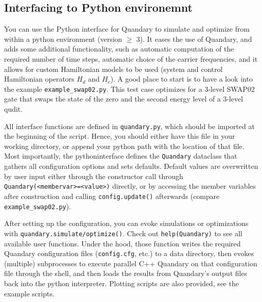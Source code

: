 \documentclass[11pt]{article}
\begin{document}
\subsection{Interfacing to Python environemnt}
You can use the Python interface for Quandary to simulate and optimize from within a python environment (version $\geq$ 3). It eases the use of Quandary, and adds some additional functionality, such as automatic computation of the required number of time steps, automatic choice of the carrier frequencies, and it allows for custom Hamiltonian models to be used (system and control Hamiltonian operators $H_d$ and $H_c$). A good place to start is to have a look into the example \texttt{example\_swap02.py}. This test case optimizes for a 3-level SWAP02 gate that swaps the state of the zero and the second energy level of a 3-level qudit. 

All interface functions are defined in \texttt{quandary.py}, which should be imported at the beginning of the script. Hence, you should either have this file in your working directory, or append your python path with the location of that file.
Most importantly, the pythoninterface defines the \texttt{Quandary} dataclass that gathers all configuration options and sets defaults. Default values are overwritten by user input either through the constructor call through \texttt{Quandary(<membervar>=<value>)} directly, or by accessing the member variables after construction and calling \texttt{config.update()} afterwards (compare \texttt{example\_swap02.py}). 

After setting up the configuration, you can evoke simulations or optimizations with \texttt{quandary.simulate/optimize()}. Check out \texttt{help(Quandary)} to see all available user functions. Under the hood, those function writes the required Quandary configuration files (\texttt{config.cfg}, etc.) to a data directory, then evokes (multiple) subprocesses to execute parallel C++ Quandary on that configuration file through the shell, and then loads the results from Quandary's output files back into the python interpreter. Plotting scripts are also provided, see the example scripts.
\end{document}
